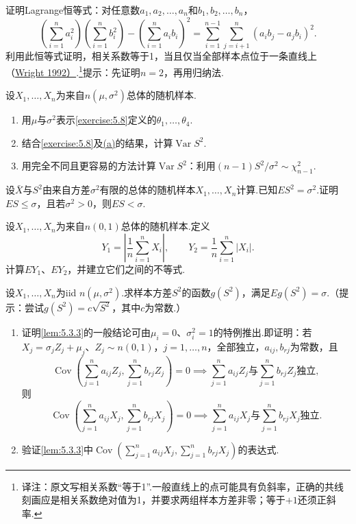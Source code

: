 \begin{exercise}\label{exercise:5.9}
证明Lagrange恒等式：对任意数$a_1,a_2,\ldots,a_n$和$b_1,b_2,\ldots,b_n$，
$$\left(\sum_{i=1}^na_i^2\right)\left(\sum_{i=1}^nb_i^2\right)-\left(\sum_{i=1}^na_ib_i\right)^2=\sum_{i=1}^{n-1}\sum_{j=i+1}^n(a_ib_j-a_jb_i)^2.$$
利用此恒等式证明，相关系数等于1，当且仅当全部样本点位于一条直线上（\hyperref[bib:source334]{Wright 1992）}.\footnote{译注：原文写相关系数“等于1”.一般直线上的点可能具有负斜率，正确的共线刻画应是相关系数绝对值为1，并要求两组样本方差非零；等于$+1$还须正斜率.}提示：先证明$n=2$，再用归纳法.
\end{exercise}
\begin{exercise}\label{exercise:5.10}
设$X_1,\ldots,X_n$为来自$n(\mu,\sigma^2)$总体的随机样本.
\begin{enumerate}[label=(\alph*)]
\item{}\label{itm:exercise:5.10:a} 用$\mu$与$\sigma^2$表示\autoref{exercise:5.8}定义的$\theta_1,\ldots,\theta_4$.
\item 结合\autoref{exercise:5.8}及\hyperref[itm:exercise:5.10:a]{(a)}的结果，计算$\operatorname{Var}S^2$.
\item 用完全不同且更容易的方法计算$\operatorname{Var}S^2$：利用$(n-1)S^2/\sigma^2\sim\chi_{n-1}^2$.
\end{enumerate}
\end{exercise}
\begin{exercise}\label{exercise:5.11}
设$\bar X$与$S^2$由来自方差$\sigma^2$有限的总体的随机样本$X_1,\ldots,X_n$计算.已知$ES^2=\sigma^2$.证明$ES\le\sigma$，且若$\sigma^2>0$，则$ES<\sigma$.
\end{exercise}
\begin{exercise}\label{exercise:5.12}
设$X_1,\ldots,X_n$为来自$n(0,1)$总体的随机样本.定义
$$Y_1=\left|\frac1n\sum_{i=1}^nX_i\right|,\qquad Y_2=\frac1n\sum_{i=1}^n|X_i|.$$
计算$EY_1$、$EY_2$，并建立它们之间的不等式.
\end{exercise}
\begin{exercise}\label{exercise:5.13}
设$X_1,\ldots,X_n$为iid $n(\mu,\sigma^2)$.求样本方差$S^2$的函数$g(S^2)$，满足$Eg(S^2)=\sigma$.（提示：尝试$g(S^2)=c\sqrt{S^2}$，其中$c$为常数.）
\end{exercise}
\begin{exercise}\label{exercise:5.14}\leavevmode
\begin{enumerate}[label=(\alph*)]
\item 证明\autoref{lem:5.3.3}的一般结论可由$\mu_i=0$、$\sigma_i^2=1$的特例推出.即证明：若$X_j=\sigma_jZ_j+\mu_j$、$Z_j\sim n(0,1)$，$j=1,\ldots,n$，全部独立，$a_{ij},b_{rj}$为常数，且
$$\operatorname{Cov}\left(\sum_{j=1}^na_{ij}Z_j,\sum_{j=1}^nb_{rj}Z_j\right)=0\implies\sum_{j=1}^na_{ij}Z_j\text{与}\sum_{j=1}^nb_{rj}Z_j\text{独立},$$
则
$$\operatorname{Cov}\left(\sum_{j=1}^na_{ij}X_j,\sum_{j=1}^nb_{rj}X_j\right)=0\implies\sum_{j=1}^na_{ij}X_j\text{与}\sum_{j=1}^nb_{rj}X_j\text{独立}.$$
\item 验证\autoref{lem:5.3.3}中$\operatorname{Cov}(\sum_{j=1}^na_{ij}X_j,\sum_{j=1}^nb_{rj}X_j)$的表达式.
\end{enumerate}
\end{exercise}
